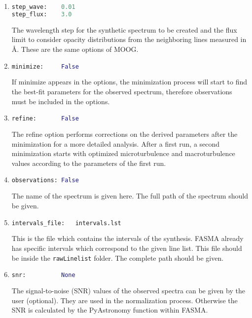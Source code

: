 \documentclass[a4paper,12pt]{article}
\begin{document}
\begin{enumerate}
\item
\begin{lstlisting}[language=Python]
step_wave:    0.01
step_flux:    3.0
\end{lstlisting}
The wavelength step for the synthetic spectrum to be created and the flux limit to consider opacity distributions from the neighboring lines measured in \AA{}. These are the same options of MOOG.

\item
\begin{lstlisting}[language=Python]
minimize:     False
\end{lstlisting}
If minimize appears in the options, the minimization process will start to find the best-fit parameters for the observed spectrum, therefore observations must be included in the options.

\item
\begin{lstlisting}[language=Python]
refine:       False
\end{lstlisting}
The refine option performs corrections on the derived parameters after the minimization for a more detailed analysis. After a first run, a second minimization starts with optimized
microturbulence and macroturbulence values according to the parameters of the first run.

\item
\begin{lstlisting}[language=Python]
observations: False
\end{lstlisting}
The name of the spectrum is given here. The full path of the spectrum should be given.

\item
\begin{lstlisting}[language=Python]
intervals_file:   intervals.lst
\end{lstlisting}
This is the file which contains the intervals of the synthesis. FASMA already has specific intervals which correspond to the given line list. This file should be inside the \texttt{rawLinelist} folder. 
The complete path should be given. 

\item
\begin{lstlisting}[language=Python]
snr:          None
\end{lstlisting}
The signal-to-noise (SNR) values of the observed spectra can be given by the user (optional). They are used in the normalization process. Otherwise the SNR is calculated by the PyAstronomy function 
within FASMA.


\end{enumerate}
\end{document}

